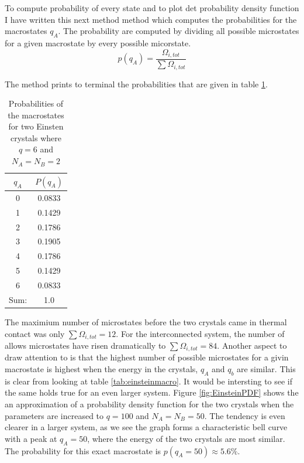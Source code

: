 \documentclass[10pt,a4paper]{amsart}
\begin{document}


To compute probability of every state and to plot det probability density function I have written this next method method which computes the probabilities for the macrostates $q_A$. The probability are computed by dividing all possible microstates for a given macrostate by every possible micorstate.
\begin{equation}
p(q_A)=\frac{\Omega_{i,tot}}{\sum\Omega_{i,tot}}
\end{equation}


The method prints to terminal the probabilities that are given in table \ref{tab:einsteinprobs}.
\begin{table}[h]
\caption{Probabilities of the macrostates for two Einsten crystals where $q=6$ and $N_A=N_B=2$}
\begin{tabular}{cc} \hline
 $q_A$ & $P(q_A)$ \\ \hline
 0 & 0.0833 \\
 1 & 0.1429 \\
 2 & 0.1786 \\
 3 & 0.1905 \\
 4 & 0.1786 \\
 5 & 0.1429 \\
 6 & 0.0833 \\ \hline
 Sum: & 1.0 \\ \hline
\end{tabular}
\label{tab:einsteinprobs}
\end{table}

The maximium number of microstates before the two crystals came in thermal contact was only $\sum\Omega_{i,tot}=12$. For the interconnected system, the number of allows microstates have risen dramatically to $\sum\Omega_{i,tot}=84$. Another aspect to draw attention to is that the highest number of possible microstates for a givin macrostate is highest when the energy in the crystals, $q_A$ and $q_b$ are similar. This is clear from looking at table \ref{tab:einsteinmacro}. It would be intersting to see if the same holds true for an even larger system. Figure \ref{fig:EinsteinPDF} shows the an approximation of a probability density function for the two crystals when the parameters are increased to $q=100$ and $N_A=N_B=50$. The tendency is even clearer in a larger system, as we see the graph forms a characteristic bell curve with a peak at $q_A=50$, where the energy of the two crystals are most similar. The probability for this exact macrostate is $p(q_A=50) \approx 5.6\%$.
\end{document}
